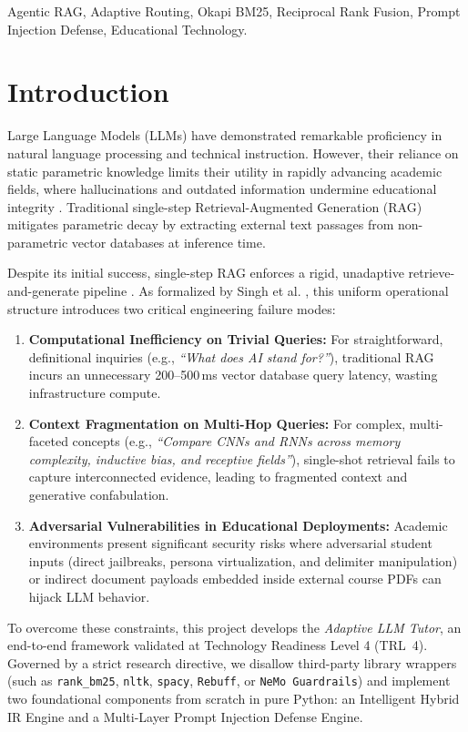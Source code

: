 \documentclass[conference]{IEEEtran}
\begin{document}
\begin{IEEEkeywords}
Agentic RAG, Adaptive Routing, Okapi BM25, Reciprocal Rank Fusion, Prompt Injection Defense, Educational Technology.
\end{IEEEkeywords}

\section{Introduction}
Large Language Models (LLMs) have demonstrated remarkable proficiency in natural language processing and technical instruction. However, their reliance on static parametric knowledge limits their utility in rapidly advancing academic fields, where hallucinations and outdated information undermine educational integrity \cite{huang2024hallucination}. Traditional single-step Retrieval-Augmented Generation (RAG) \cite{lewis2020rag} mitigates parametric decay by extracting external text passages from non-parametric vector databases at inference time. 

Despite its initial success, single-step RAG enforces a rigid, unadaptive retrieve-and-generate pipeline \cite{singh2026agentic}. As formalized by Singh et al. \cite{singh2026agentic}, this uniform operational structure introduces two critical engineering failure modes:
\begin{enumerate}
    \item \textbf{Computational Inefficiency on Trivial Queries:} For straightforward, definitional inquiries (e.g., \textit{``What does AI stand for?''}), traditional RAG incurs an unnecessary 200--500\,ms vector database query latency, wasting infrastructure compute.
    \item \textbf{Context Fragmentation on Multi-Hop Queries:} For complex, multi-faceted concepts (e.g., \textit{``Compare CNNs and RNNs across memory complexity, inductive bias, and receptive fields''}), single-shot retrieval fails to capture interconnected evidence, leading to fragmented context and generative confabulation.
    \item \textbf{Adversarial Vulnerabilities in Educational Deployments:} Academic environments present significant security risks where adversarial student inputs (direct jailbreaks, persona virtualization, and delimiter manipulation) or indirect document payloads embedded inside external course PDFs can hijack LLM behavior.
\end{enumerate}

To overcome these constraints, this project develops the \textit{Adaptive LLM Tutor}, an end-to-end framework validated at Technology Readiness Level 4 (TRL~4). Governed by a strict research directive, we disallow third-party library wrappers (such as \texttt{rank\_bm25}, \texttt{nltk}, \texttt{spacy}, \texttt{Rebuff}, or \texttt{NeMo Guardrails}) and implement two foundational components from scratch in pure Python: an Intelligent Hybrid IR Engine and a Multi-Layer Prompt Injection Defense Engine.
\end{document}
